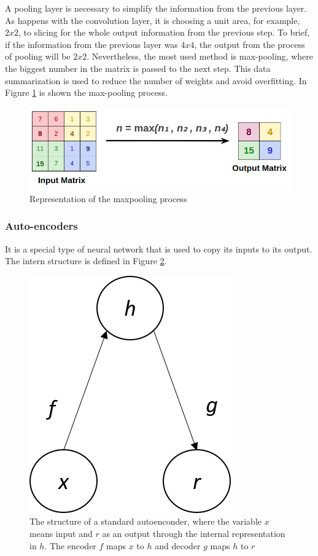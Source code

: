 A pooling layer is necessary to simplify the information from the previous layer. As happens with the convolution layer, it is choosing a unit area, for example, $2x2$, to slicing for the whole output information from the previous step. To brief, if the information from the previous layer was $4x4$, the output from the process of pooling will be $2x2$. Nevertheless, the most used method is max-pooling, where the biggest number in the matrix is passed to the next step. This data summarization is used to reduce the number of weights and avoid overfitting. In Figure \ref{fig:pooling} is shown the max-pooling process.

\begin{figure}[H]
\centering
\includegraphics[scale=0.35]{imagens/max_pooling.png}
\caption{Representation of the maxpooling process \cite{lecture}}
\label{fig:pooling}
\end{figure}




\subsubsection{Auto-encoders}\label{auto-encoder}

It is a special type of neural network that is used to copy its inputs to its output. The intern structure is defined in Figure \ref{fig:autoencoder}. 

\begin{figure}[H]
\centering
\includegraphics[scale=0.7]{imagens/autoencoder.png}
\caption{The structure of a standard autoenconder, where the variable $x$ means input and $r$ as an output through the internal representation in $h$. The encoder $f$ maps $x$ to $h$ and decoder $g$ maps $h$ to $r$}
\label{fig:autoencoder}
\end{figure}

